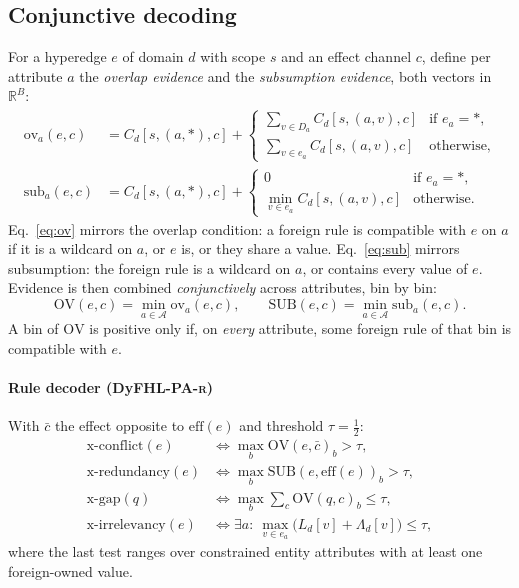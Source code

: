 \documentclass[preprint,12pt]{elsarticle}
\theoremstyle{definition}
\newcommand{\name}{DyFHL-PA\xspace}
\newcommand{\R}{\textsc{r}}
\newcommand{\eff}{\mathrm{eff}}
\begin{document}
\subsection{Conjunctive decoding}
\label{sec:decode}
For a hyperedge $e$ of domain $d$ with scope $s$ and an effect channel $c$, define per attribute $a$ the \emph{overlap evidence} and the \emph{subsumption evidence}, both vectors in $\mathbb{R}^B$:
\begin{align}
\mathrm{ov}_a(e,c)&=C_d[s,(a,\ast),c]+
\begin{cases}\sum_{v\in D_a}C_d[s,(a,v),c] & \text{if } e_a=\ast,\\[2pt]
\sum_{v\in e_a}C_d[s,(a,v),c] & \text{otherwise,}\end{cases}\label{eq:ov}\\
\mathrm{sub}_a(e,c)&=C_d[s,(a,\ast),c]+
\begin{cases}0 & \text{if } e_a=\ast,\\[2pt]
\min_{v\in e_a}C_d[s,(a,v),c] & \text{otherwise.}\end{cases}\label{eq:sub}
\end{align}
Eq.~\eqref{eq:ov} mirrors the overlap condition: a foreign rule is compatible with $e$ on $a$ if it is a wildcard on $a$, or $e$ is, or they share a value. Eq.~\eqref{eq:sub} mirrors subsumption: the foreign rule is a wildcard on $a$, or contains every value of $e$. Evidence is then combined \emph{conjunctively} across attributes, bin by bin:
\begin{equation}
\mathrm{OV}(e,c)=\min_{a\in\mathcal{A}}\mathrm{ov}_a(e,c),\qquad \mathrm{SUB}(e,c)=\min_{a\in\mathcal{A}}\mathrm{sub}_a(e,c).
\label{eq:conj}
\end{equation}
A bin of $\mathrm{OV}$ is positive only if, on \emph{every} attribute, some foreign rule of that bin is compatible with $e$.

\paragraph{Rule decoder (\name-\R)} With $\bar c$ the effect opposite to $\eff(e)$ and threshold $\tau=\tfrac12$:
\begin{align*}
\text{x-conflict}(e)&\iff \max_b \mathrm{OV}(e,\bar c)_b>\tau,\\
\text{x-redundancy}(e)&\iff \max_b \mathrm{SUB}(e,\eff(e))_b>\tau,\\
\text{x-gap}(q)&\iff \max_b \textstyle\sum_c\mathrm{OV}(q,c)_b\le\tau,\\
\text{x-irrelevancy}(e)&\iff \exists a:\ \max_{v\in e_a}\big(L_d[v]+\Lambda_d[v]\big)\le\tau,
\end{align*}
where the last test ranges over constrained entity attributes with at least one foreign-owned value.
\end{document}
